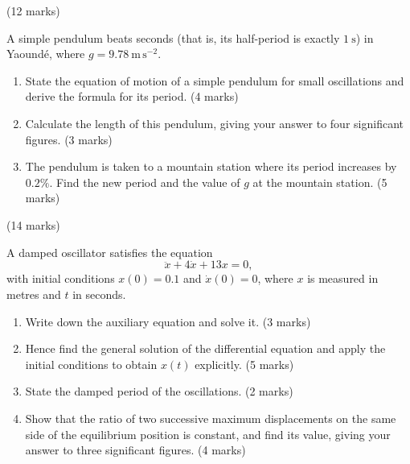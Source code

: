\documentclass[11pt]{article}
\begin{document}
\begin{exercice} \hfill (12 marks)

A simple pendulum beats seconds (that is, its half-period is exactly $1\ \mathrm{s}$) in Yaoundé, where $g = 9.78\ \mathrm{m\,s^{-2}}$.
\begin{enumerate}
\item State the equation of motion of a simple pendulum for small oscillations and derive the formula for its period. \hfill (4 marks)
\item Calculate the length of this pendulum, giving your answer to four significant figures. \hfill (3 marks)
\item The pendulum is taken to a mountain station where its period increases by $0.2\%$. Find the new period and the value of $g$ at the mountain station. \hfill (5 marks)
\end{enumerate}
\end{exercice}

\begin{exercice} \hfill (14 marks)

A damped oscillator satisfies the equation
\[
\ddot{x} + 4\dot{x} + 13x = 0,
\]
with initial conditions $x(0) = 0.1$ and $\dot{x}(0) = 0$, where $x$ is measured in metres and $t$ in seconds.
\begin{enumerate}
\item Write down the auxiliary equation and solve it. \hfill (3 marks)
\item Hence find the general solution of the differential equation and apply the initial conditions to obtain $x(t)$ explicitly. \hfill (5 marks)
\item State the damped period of the oscillations. \hfill (2 marks)
\item Show that the ratio of two successive maximum displacements on the same side of the equilibrium position is constant, and find its value, giving your answer to three significant figures. \hfill (4 marks)
\end{enumerate}
\end{exercice}
\end{document}
